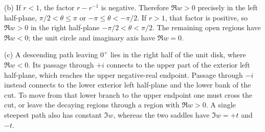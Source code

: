 (b) If $r<1$, the factor $r-r^{-1}$ is negative. Therefore
$\Re w>0$ precisely in the left half-plane,
$\pi/2<\theta\le\pi$ or $-\pi\le\theta<-\pi/2$.
If $r>1$, that factor is positive, so $\Re w>0$ in the
right half-plane $-\pi/2<\theta<\pi/2$.
The remaining open regions have $\Re w<0$; the unit circle
and imaginary axis have $\Re w=0$.

(c) A descending path leaving $0^+$ lies in the right half of
the unit disk, where $\Re w<0$. Its passage through $+i$
connects to the upper part of the exterior left half-plane,
which reaches the upper negative-real endpoint. Passage through
$-i$ instead connects to the lower exterior left half-plane and
the lower bank of the cut. To move from that lower branch to the
upper endpoint one must cross the cut, or leave the decaying
regions through a region with $\Re w>0$. A single steepest path
also has constant $\Im w$, whereas the two saddles have
$\Im w=+t$ and $-t$.

